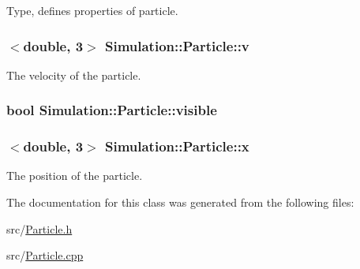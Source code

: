 Type, defines properties of particle. 

\hypertarget{classSimulation_1_1Particle_aedd9ec08978292732fc38dd6d93dc3b4}{
\subsubsection[{v}]{$<$double, 3$>$ Simulation\-::\-Particle\-::v\hspace{0.3cm}{\ttfamily [private]}}}\label{classSimulation_1_1Particle_aedd9ec08978292732fc38dd6d93dc3b4}


The velocity of the particle. 

\hypertarget{classSimulation_1_1Particle_a20e56ab0bd4071b5cb479775742f2cfe}{
\subsubsection[{visible}]{\setlength{\rightskip}{0pt plus 5cm}bool Simulation\-::\-Particle\-::visible\hspace{0.3cm}{\ttfamily [private]}}}\label{classSimulation_1_1Particle_a20e56ab0bd4071b5cb479775742f2cfe}
\hypertarget{classSimulation_1_1Particle_a37114cf327ef0591939f157489434bde}{
\subsubsection[{x}]{$<$double, 3$>$ Simulation\-::\-Particle\-::x\hspace{0.3cm}{\ttfamily [private]}}}\label{classSimulation_1_1Particle_a37114cf327ef0591939f157489434bde}


The position of the particle. 



The documentation for this class was generated from the following files\-:\begin{DoxyCompactItemize}
\item 
src/\hyperlink{Particle_8h}{Particle.\-h}\item 
src/\hyperlink{Particle_8cpp}{Particle.\-cpp}\end{DoxyCompactItemize}
